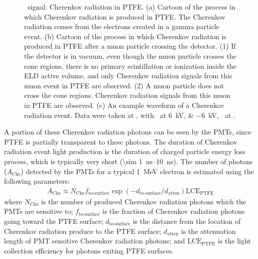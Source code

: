 \begin{figure}[!p]
\begin{subfigure}[b]{0.6\textwidth}
		\caption{}
		\label{fig:Chrenkov b}
	\end{subfigure}
	\caption[\gtest\ signal: Cherenkov radiation in PTFE.]{\gtest\ signal: Cherenkov radiation in PTFE. (a) Cartoon of the process in which Cherenkov radiation is produced in PTFE. The Cherenkov radiation comes from the electrons created in a gamma particle event. (b) Cartoon of the process in which Cherenkov radiation is produced in PTFE after a muon particle crossing the detector. (1) If the detector is in vacuum, even though the muon particle crosses the cone regions, there is no primary scintillation or ionization inside the ELD active volume, and only Cherenkov radiation signals from this muon event in PTFE are observed. (2) A muon particle does not cross the cone regions. Cherenkov radiation signals from this muon in PTFE are observed. (c) An example waveform of a Cherenkov radiation event. Data were taken at , with \opvtvb\ at \SIlist{+6;-6}{kV}, \opgd\ at \standarddensity .%
	}
	\label{fig:Chrenkov}
\end{figure}

A portion of these Cherenkov radiation photons can be seen by the PMTs, since PTFE is partially transparent to these photons. The duration of Cherenkov radiation event light production is the duration of charged particle energy loss process, which is typically very short (\SIrange{\sim 1}{10}{\ns}). The number of photons ($A_{\text{Che}}$) detected by the PMTs for a typical \SI{1}{\MeV} electron is estimated using the following parameters:  
\begin{align}
	A_{\text{Che}} \approx N_{\text{Che}} f_{\text{to-surface}} \exp \left ( - d_{\text{to-surface}}/d_{\text{atten}} \right ) \text{LCE}_{\text{PTFE}} 
\end{align}
where $N_{\text{Che}}$ is the number of produced Cherenkov radiation photons which the PMTs are sensitive to; $f_{\text{to-surface}}$ is the fraction of Cherenkov radiation photons going toward the PTFE surface; $d_{\text{to-surface}}$ is the distance from the location of Cherenkov radiation produce to the PTFE surface; $d_{\text{atten}}$ is the attenuation length of PMT sensitive Cherenkov radiation photons; and $\text{LCE}_{\text{PTFE}}$ is the light collection efficiency for photons exiting PTFE surfaces. 

